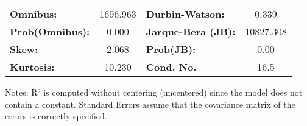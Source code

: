 \begin{center}
\begin{tabular}{lcccccc}
\bottomrule
\end{tabular}
\begin{tabular}{lclc}
\textbf{Omnibus:}       & 1696.963 & \textbf{  Durbin-Watson:     } &     0.339  \\
\textbf{Prob(Omnibus):} &   0.000  & \textbf{  Jarque-Bera (JB):  } & 10827.308  \\
\textbf{Skew:}          &   2.068  & \textbf{  Prob(JB):          } &      0.00  \\
\textbf{Kurtosis:}      &  10.230  & \textbf{  Cond. No.          } &      16.5  \\
\bottomrule
\end{tabular}
\end{center}

Notes: \newline
 [1] R² is computed without centering (uncentered) since the model does not contain a constant. \newline
 [2] Standard Errors assume that the covariance matrix of the errors is correctly specified.